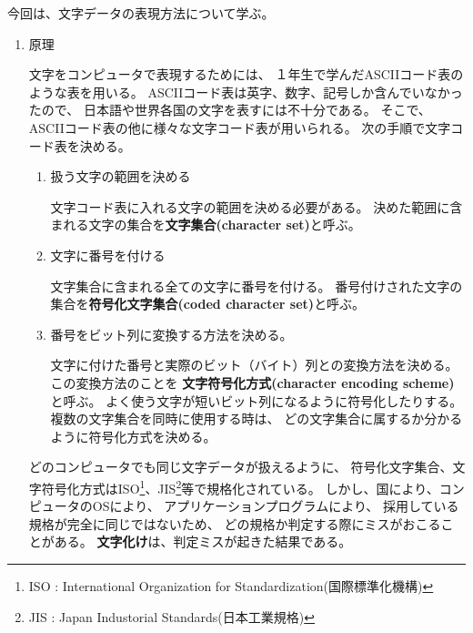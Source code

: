 \documentclass[a4j,dvipdfmx]{jarticle}
\begin{document}
\def\lstlistingname{リスト}


今回は、文字データの表現方法について学ぶ。

\begin{enumerate}

\item 原理

文字をコンピュータで表現するためには、
１年生で学んだASCIIコード表のような表を用いる。
ASCIIコード表は英字、数字、記号しか含んでいなかったので、
日本語や世界各国の文字を表すには不十分である。
そこで、ASCIIコード表の他に様々な文字コード表が用いられる。
次の手順で文字コード表を決める。

\begin{enumerate}
\item 扱う文字の範囲を決める

文字コード表に入れる文字の範囲を決める必要がある。
決めた範囲に含まれる文字の集合を{\bf 文字集合(character set)}と呼ぶ。

\item 文字に番号を付ける

文字集合に含まれる全ての文字に番号を付ける。
番号付けされた文字の集合を{\bf 符号化文字集合(coded character set)}と呼ぶ。

\item 番号をビット列に変換する方法を決める。

文字に付けた番号と実際のビット（バイト）列との変換方法を決める。
この変換方法のことを
{\bf 文字符号化方式(character encoding scheme)}と呼ぶ。
よく使う文字が短いビット列になるように符号化したりする。
複数の文字集合を同時に使用する時は、
どの文字集合に属するか分かるように符号化方式を決める。
\end{enumerate}

どのコンピュータでも同じ文字データが扱えるように、
符号化文字集合、文字符号化方式はISO\footnote{
ISO : International Organization for Standardization(国際標準化機構)
}、JIS\footnote{
JIS : Japan Industorial Standards(日本工業規格)
}等で規格化されている。
しかし、国により、コンピュータのOSにより、
アプリケーションプログラムにより、
採用している規格が完全に同じではないため、
どの規格か判定する際にミスがおこることがある。
{\bf 文字化け}は、判定ミスが起きた結果である。


\end{enumerate}
\end{document}
